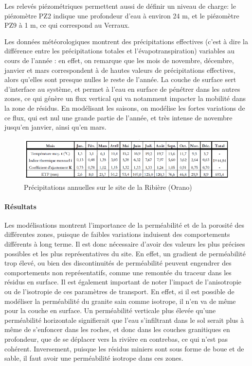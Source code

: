 \documentclass{article}
\begin{document}
Les relevés piézométriques permettent aussi de définir un niveau de charge: le piézomètre PZ2 indique une profondeur d’eau à environ 24 m, et le piézomètre PZ9 à 1 m, ce qui correspond au Verraux.

Les données météorologiques montrent des précipitations effectives (c’est à dire la différence entre les précipitations totales et l’évapotranspiration) variables au cours de l’année : en effet, on remarque que les mois de novembre, décembre, janvier et mars correspondent à de hautes valeurs de précipitations effectives, alors qu’elles sont presque nulles le reste de l’année. La couche de surface sert d'interface au système, et permet à l'eau en surface de pénétrer dans les autres zones, ce qui génère un flux vertical qui va notamment impacter la mobilité dans la zone de résidus. En modélisant les saisons, on modélise les fortes variations de ce flux, qui est nul une grande partie de l'année, et très intense de novembre jusqu'en janvier, ainsi qu'en mars.


\begin{figure}[H]
    \centering
    \includegraphics[width=0.8\linewidth]{III_B_3_5.png}
    \caption{Précipitations annuelles sur le site de la Ribière (Orano)}
    \label{fig:precipitations_ribiere}
\end{figure}

\paragraph{Résultats}

Les modélisations montrent l’importance de la perméabilité et de la porosité des différentes zones, puisque de faibles variations induisent des comportements différents à long terme. Il est donc nécessaire d’avoir des valeurs les plus précises possibles et les plus représentatives du site. En effet, un gradient de perméabilité trop élevé, ou bien des discontinuités de perméabilité peuvent engendrer des comportements non représentatifs, comme une remontée du traceur dans les résidus en surface. Il est également important de noter l'impact de l'anisotropie ou de l'isotropie de ces paramètres de transport. En effet, si il est possible de modéliser la perméabilité du granite sain comme isotrope, il n'en va de même pour la couche en surface. Un perméabilité verticale plus élevée qu'une perméabilité horizontale signifierait que l'eau s'infiltrant dans le sol serait plus à même de s'enfoncer dans les roches, et donc dans les couches granitiques en profondeur, que de se déplacer vers la rivière en contrebas, ce qui n'est pas cohérent. Inversement, puisque les résidus miniers sont sous forme de boue et de sable, il faut avoir une perméabilité isotrope dans ces zones.
\end{document}
